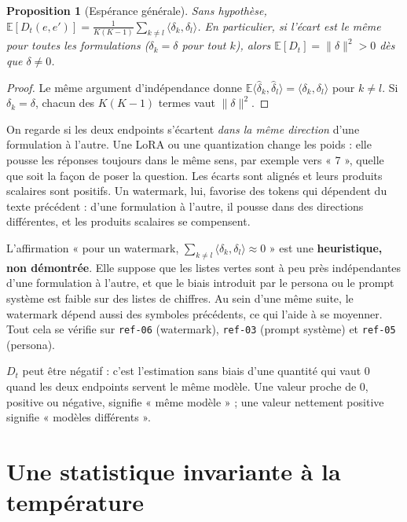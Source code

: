\documentclass[11pt,a4paper]{report}
\theoremstyle{definition}
\theoremstyle{plain}
\newtheorem{proposition}{Proposition}[chapter]
\newcommand{\E}{\mathbb{E}}
\newcommand{\code}[1]{\texttt{#1}}
\begin{document}
\begin{proposition}[Espérance générale]\label{prop:gen}
Sans hypothèse, $\E[D_t(e,e')] = \frac{1}{K(K-1)}\sum_{k\neq l}\langle\delta_k,\delta_l\rangle$. En particulier, si l'écart est le même pour toutes les formulations ($\delta_k=\delta$ pour tout $k$), alors $\E[D_t] = \|\delta\|^2 > 0$ dès que $\delta\neq0$.
\end{proposition}
\begin{proof}
Le même argument d'indépendance donne $\E\langle\hat\delta_k,\hat\delta_l\rangle = \langle\delta_k,\delta_l\rangle$ pour $k\neq l$. Si $\delta_k=\delta$, chacun des $K(K-1)$ termes vaut $\|\delta\|^2$.
\end{proof}

\begin{intuition}
On regarde si les deux endpoints s'écartent \emph{dans la même direction} d'une formulation à l'autre. Une LoRA ou une quantization change les poids : elle pousse les réponses toujours dans le même sens, par exemple vers « 7 », quelle que soit la façon de poser la question. Les écarts sont alignés et leurs produits scalaires sont positifs. Un watermark, lui, favorise des tokens qui dépendent du texte précédent : d'une formulation à l'autre, il pousse dans des directions différentes, et les produits scalaires se compensent.
\end{intuition}

\begin{limite}
L'affirmation « pour un watermark, $\sum_{k\neq l}\langle\delta_k,\delta_l\rangle\approx0$ » est une \textbf{heuristique, non démontrée}. Elle suppose que les listes vertes sont à peu près indépendantes d'une formulation à l'autre, et que le biais introduit par le persona ou le prompt système est faible sur des listes de chiffres. Au sein d'une même suite, le watermark dépend aussi des symboles précédents, ce qui l'aide à se moyenner. Tout cela se vérifie sur \code{ref-06} (watermark), \code{ref-03} (prompt système) et \code{ref-05} (persona).
\end{limite}

\begin{retenir}
$D_t$ peut être négatif : c'est l'estimation sans biais d'une quantité qui vaut 0 quand les deux endpoints servent le même modèle. Une valeur proche de 0, positive ou négative, signifie « même modèle » ; une valeur nettement positive signifie « modèles différents ».
\end{retenir}

\section{Une statistique invariante à la température}
\end{document}
